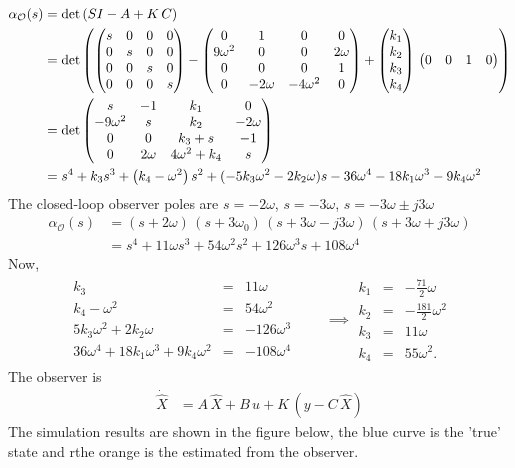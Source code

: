 \begin{align*}
    \alpha_\mathcal{O}(s) &= \text{det}\left(SI - A + K\,C\right) \\
    &= \text{det}\left(\begin{pmatrix}
        s & 0 & 0 & 0 \\ 0 & s & 0 & 0 \\ 0 & 0 & s & 0 \\ 0 & 0 & 0 & s
    \end{pmatrix} - \begin{pmatrix} 0 & 1 & 0 & 0\\ 9\omega^2 & 0 & 0 & 2\omega \\ 0 & 0 & 0 & 1 \\ 0 & -2\omega & -4\omega^2 & 0 \end{pmatrix} + \begin{pmatrix}
        k_1 \\ k_2 \\ k_3 \\ k_4
    \end{pmatrix}\,\begin{pmatrix}
        0 & 0 & 1 & 0
    \end{pmatrix}\right) \\
    &= \text{det}\begin{pmatrix}
        s & -1 & k_1 & 0 \\ -9\omega^2 & s & k_2 & -2\omega \\ 0 & 0 & k_3 + s & -1 \\ 0 & 2\omega & 4\omega^2 + k_4 & s
    \end{pmatrix}\\
    &= s^4 + k_3s^3 + \left(k_4 - \omega^2\right)s^2 + (-5k_3\omega^2-2k_2\omega)s - 36\omega^4 - 18k_1\omega^3 - 9k_4\omega^2
\end{align*}
The closed-loop observer poles are $s = -2\omega$, $s = -3\omega$, $s = -3\omega \pm j3\omega$
\begin{align*}
    \alpha_\mathcal{O}(s) &= \left(s + 2\omega\right)\,\left(s + 3\omega_0\right)\,\left(s + 3\omega - j3\omega\right)\,\left(s + 3\omega + j3\omega\right) \\
    &= s^4 + 11\omega s^3 + 54\omega^2 s^2 + 126\omega^3 s + 108\omega^4
\end{align*}
Now, 
\begin{align*}
    \begin{array}{rcl}
        k_3 & = & 11\omega \\
        k_4 - \omega^2 & = & 54\omega^2 \\
        5k_3\omega^2 + 2k_2\omega & = & -126\omega^3 \\
        36\omega^4 + 18k_1\omega^3 + 9k_4\omega^2 & = & -108\omega^4
    \end{array} \qquad \implies \begin{array}{rcl}
        k_1 & = & -\frac{71}{2}\omega \\ 
        k_2 & = & -\frac{181}{2}\omega^2 \\
        k_3 & = & 11\omega \\ 
        k_4 & = & 55\omega^2.
    \end{array} 
\end{align*}
The observer is 
\begin{align*}
    \dot{\hat X} &= A\,\hat X + B\,u + K\,\left(y - C\,\hat X\right)
\end{align*}
The simulation results are shown in the figure below, the blue curve is the 'true' state and rthe orange is the estimated from the observer.

